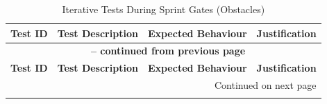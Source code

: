 \begin{longtable}{|p{}|p{}|p{}|p{}|}
	\caption{Iterative Tests During Sprint Gates (Obstacles)} \label{tab:sprint_gates_tests_lt_rev} \\
	\hline
	\textbf{Test ID} & \textbf{Test Description} & \textbf{Expected Behaviour} & \textbf{Justification} \\
	\hline
	\endfirsthead
	\multicolumn{4}{c}{{\bfseries \tablename\ \thetable{} -- continued from previous page}} \\ \hline
	\textbf{Test ID} & \textbf{Test Description} & \textbf{Expected Behaviour} & \textbf{Justification} \\ \hline \endhead
	\hline \multicolumn{4}{r}{{Continued on next page}} \\ \endfoot \hline \endlastfoot
	

\end{longtable}

